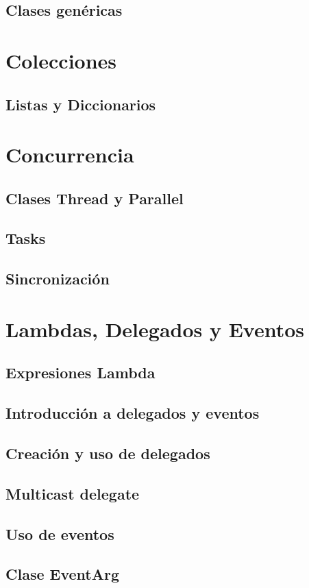 \documentclass[12pt,a4paper]{report}
\begin{document}
{\section{Clases genéricas}

\chapter{Colecciones}
\section{Listas y Diccionarios}

\chapter{Concurrencia}
\section{Clases Thread y Parallel}
\section{Tasks}
\section{Sincronización}

\chapter{Lambdas, Delegados y Eventos}
\section{Expresiones Lambda}
\section{Introducción a delegados y eventos}
\section{Creación y uso de delegados}
\section{Multicast delegate}
\section{Uso de eventos}
\section{Clase EventArg}

}
\end{document}
